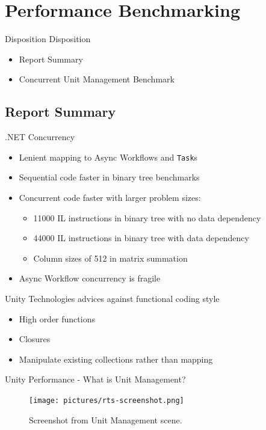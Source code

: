 \section{Performance Benchmarking}
\begin{frame}{\secname}{Disposition}
	Disposition
    \begin{itemize}
        \item Report Summary
        \item Concurrent Unit Management Benchmark
	\end{itemize}
\end{frame}

\subsection{Report Summary}\label{sec:authors}
\begin{frame}{\secname}{\subsecname}
	.NET Concurrency
	\begin{itemize}
		\item Lenient mapping to Async Workflows and \texttt{Task}s %
		\item Sequential code faster in binary tree benchmarks
		\item Concurrent code faster with larger problem sizes:
		\begin{itemize}
			\item 11000 IL instructions in binary tree with no data dependency
			\item 44000 IL instructions in binary tree with data dependency
			\item Column sizes of 512 in matrix summation
		\end{itemize}
		\item Async Workflow concurrency is fragile
	\end{itemize}
\end{frame}

\begin{frame}{\secname}{\subsecname}
	Unity Technologies advices against functional coding style
	\begin{itemize}
		\item High order functions
		\item Closures
		\item Manipulate existing collections rather than mapping
	\end{itemize}
\end{frame}

\begin{frame}{\secname}{\subsecname}
	Unity Performance - What is Unit Management?
	\begin{figure}[h!]
        \centering
        \texttt{[image: pictures/rts-screenshot.png]}
        \caption{Screenshot from Unit Management scene.}
    \end{figure}
\end{frame}

